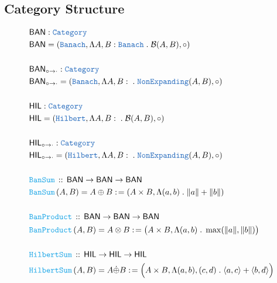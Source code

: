 \documentclass[12pt]{scrartcl}
\newcommand{\TYPE}[1]{\textcolor{NavyBlue}{\mathtt{#1}}}
\newcommand{\FUNC}[1]{\textcolor{Cerulean}{\mathtt{#1}}}
\renewcommand{\.}{\; . \;}
\newcommand{\de}{: \kern 0.1pc =}
\newcommand{\Act}[1]{\left( #1 \right)}
\newcommand{\DeclareFunc}[2]{& \FUNC{#1} \, :: \, #2 \\}
\newcommand{\DefineNamedFunc}[4]{&  \FUNC{#1}\Act{#2} = #3 \de #4 \\}
\newcommand{\Page}[1]{\begin{align*} #1 \end{align*} \newpage   }
\newcommand{\Cate}{\TYPE{Category}}
\newcommand{\Banach}{\TYPE{Banach}}
\newcommand{\Hilbert}{\TYPE{Hilbert}}
\newcommand{\BAN}{\textsf{BAN}}
\newcommand{\BANI}{{\textsf{BAN}_{\circ \to \cdot}}}
\newcommand{\HIL}{\textsf{HIL}}
\newcommand{\HILI}{{\textsf{HIL}_{\circ \to \cdot}}}
\newcommand{\B}{\mathcal{B}}
\begin{document}
\subsection{Category Structure}
\Page{
  & \BAN :  \Cate  \\
  & \BAN = ( \Banach, \Lambda A,B : \Banach \. \B(A,B), \circ) \\
  \\
  & \BANI :  \Cate  \\
  & \BANI = ( \Banach, \Lambda A,B :  \.  \TYPE{NonExpanding}(A,B), \circ) \\
  \\
  & \HIL : \Cate \\
  & \HIL = (\Hilbert, \Lambda A, B : \. \B(A,B), \circ) \\
  \\
  & \HILI : \Cate \\
  & \HILI = (\Hilbert, \Lambda A, B : \. \TYPE{NonExpanding}(A,B), \circ) \\
  \\
  \DeclareFunc{BanSum}{\BAN \to \BAN \to \BAN}
  \DefineNamedFunc{BanSum}{A,B}{A \oplus B}{(A \times B, \Lambda (a,b) \. \| a \|  + \| b \| )}
  \\
  \DeclareFunc{BanProduct}{\BAN \to \BAN \to \BAN}
  \DefineNamedFunc{BanProduct}{A,B}{A \otimes B}{\big(A \times B, \Lambda (a,b) \. \max(\| a \|, \| b\|)\big)}
  \\
  \DeclareFunc{HilbertSum}{\HIL \to \HIL \to \HIL}
  \DefineNamedFunc{HilbertSum}{A,B}{ A \dot \oplus B}{
  \Big(A \times B, \Lambda (a,b),(c,d) \. \langle a, c \rangle + \langle b, d \rangle   \Big)}
}
\end{document}
